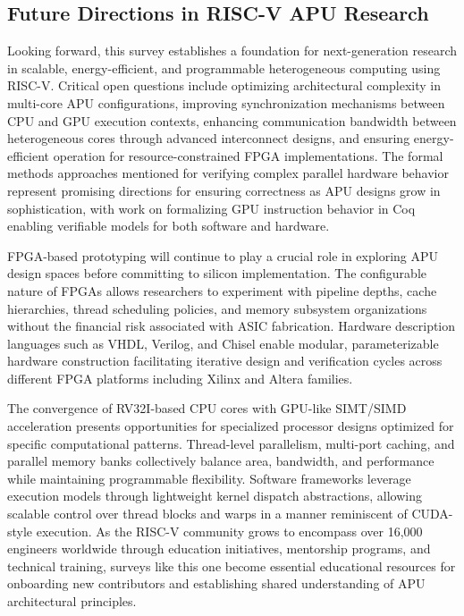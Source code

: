 \documentclass[a4paper,twoside]{article}
\begin{document}
\subsection{Future Directions in RISC-V APU Research}
Looking forward, this survey establishes a foundation for next-generation research in scalable, energy-efficient, and programmable heterogeneous computing using RISC-V. Critical open questions include optimizing architectural complexity in multi-core APU configurations, improving synchronization mechanisms between CPU and GPU execution contexts, enhancing communication bandwidth between heterogeneous cores through advanced interconnect designs, and ensuring energy-efficient operation for resource-constrained FPGA implementations. The formal methods approaches mentioned for verifying complex parallel hardware behavior represent promising directions for ensuring correctness as APU designs grow in sophistication, with work on formalizing GPU instruction behavior in Coq enabling verifiable models for both software and hardware.

FPGA-based prototyping will continue to play a crucial role in exploring APU design spaces before committing to silicon implementation. The configurable nature of FPGAs allows researchers to experiment with pipeline depths, cache hierarchies, thread scheduling policies, and memory subsystem organizations without the financial risk associated with ASIC fabrication. Hardware description languages such as VHDL, Verilog, and Chisel enable modular, parameterizable hardware construction facilitating iterative design and verification cycles across different FPGA platforms including Xilinx and Altera families.

The convergence of RV32I-based CPU cores with GPU-like SIMT/SIMD acceleration presents opportunities for specialized processor designs optimized for specific computational patterns. Thread-level parallelism, multi-port caching, and parallel memory banks collectively balance area, bandwidth, and performance while maintaining programmable flexibility. Software frameworks leverage execution models through lightweight kernel dispatch abstractions, allowing scalable control over thread blocks and warps in a manner reminiscent of CUDA-style execution. As the RISC-V community grows to encompass over 16,000 engineers worldwide through education initiatives, mentorship programs, and technical training, surveys like this one become essential educational resources for onboarding new contributors and establishing shared understanding of APU architectural principles.
\end{document}
